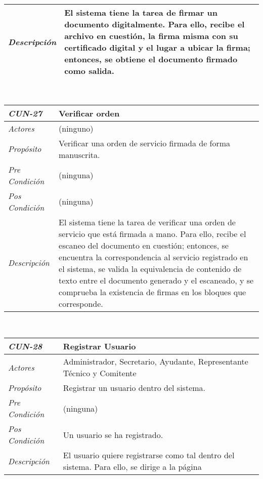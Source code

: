 \begin{center}
{\begin{tabular}{ | p{3cm} | p{12.5cm} | }
	\hline
	\raggedleft \textit{Descripci\'on} &
	El sistema tiene la tarea de firmar un documento
	digitalmente. Para ello, recibe el archivo en cuesti\'on,
	la firma misma con su certificado digital y el lugar a
	ubicar la firma; entonces, se obtiene el documento
	firmado como salida. \\
	\hline
\end{tabular}} \\[1cm]
\hypertarget{CUN-27}{%
\begin{tabular}{ | p{3cm} | p{12.5cm} | }
	\hline
	\rowcolor{lightgray}
	\hfil \textbf{\textit{CUN-27}} &
	\hfil \textbf{Verificar orden} \\
	\hline
	\raggedleft \textit{Actores} & (ninguno) \\
	\hline
	\raggedleft \textit{Prop\'osito} & Verificar una
	orden de servicio firmada de forma manuscrita. \\
	\hline
	\raggedleft \textit{Pre Condici\'on} & (ninguna) \\
	\hline
	\raggedleft \textit{Pos Condici\'on} & (ninguna) \\
	\hline
	\raggedleft \textit{Descripci\'on} &
	El sistema tiene la tarea de verificar una orden
	de servicio que est\'a firmada a mano. Para ello,
	recibe el escaneo del documento en cuesti\'on;
	entonces, se encuentra la correspondencia al
	servicio registrado en el sistema, se valida la
	equivalencia de contenido de texto entre el
	documento generado y el escaneado, y se comprueba
	la existencia de firmas en los bloques que
	corresponde. \\
	\hline
\end{tabular}} \\[1cm]
\hypertarget{CUN-28}{%
\begin{tabular}{ | p{3cm} | p{12.5cm} | }
	\hline
	\rowcolor{lightgray}
	\hfil \textbf{\textit{CUN-28}} &
	\hfil \textbf{Registrar Usuario} \\
	\hline
	\raggedleft \textit{Actores} & Administrador,
	Secretario, Ayudante, Representante T\'ecnico
	y Comitente \\
	\hline
	\raggedleft \textit{Prop\'osito} & Registrar un
	usuario dentro del sistema. \\
	\hline
	\raggedleft \textit{Pre Condici\'on} & (ninguna) \\
	\hline
	\raggedleft \textit{Pos Condici\'on} & Un usuario
	se ha registrado. \\
	\hline
	\raggedleft \textit{Descripci\'on} &
	El usuario quiere registrarse como tal dentro
	del sistema. Para ello, se dirige a la p\'agina

\end{tabular}}
\end{center}
